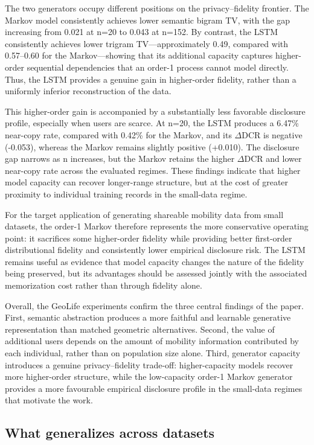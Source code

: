 \documentclass[sigconf,nonacm]{acmart}
\begin{document}
The two generators occupy different positions on the privacy–fidelity frontier. The Markov model consistently achieves lower semantic bigram TV, with the gap increasing from 0.021 at n=20 to 0.043 at n=152. By contrast, the LSTM consistently achieves lower trigram TV—approximately 0.49, compared with 0.57–0.60 for the Markov—showing that its additional capacity captures higher-order sequential dependencies that an order-1 process cannot model directly. Thus, the LSTM provides a genuine gain in higher-order fidelity, rather than a uniformly inferior reconstruction of the data.

This higher-order gain is accompanied by a substantially less favorable disclosure profile, especially when users are scarce. At n=20, the LSTM produces a 6.47\% near-copy rate, compared with 0.42\% for the Markov, and its $\Delta$DCR is negative (-0.053), whereas the Markov remains slightly positive (+0.010). The disclosure gap narrows as n increases, but the Markov retains the higher $\Delta$DCR and lower near-copy rate across the evaluated regimes. These findings indicate that higher model capacity can recover longer-range structure, but at the cost of greater proximity to individual training records in the small-data regime.

For the target application of generating shareable mobility data from small datasets, the order-1 Markov therefore represents the more conservative operating point: it sacrifices some higher-order fidelity while providing better first-order distributional fidelity and consistently lower empirical disclosure risk. The LSTM remains useful as evidence that model capacity changes the nature of the fidelity being preserved, but its advantages should be assessed jointly with the associated memorization cost rather than through fidelity alone.

Overall, the GeoLife experiments confirm the three central findings of the paper. First, semantic abstraction produces a more faithful and learnable generative representation than matched geometric alternatives. Second, the value of additional users depends on the amount of mobility information contributed by each individual, rather than on population size alone. Third, generator capacity introduces a genuine privacy–fidelity trade-off: higher-capacity models recover more higher-order structure, while the low-capacity order-1 Markov generator provides a more favourable empirical disclosure profile in the small-data regimes that motivate the work.

\subsection{What generalizes across datasets}
\label{sec:cross}
\end{document}

